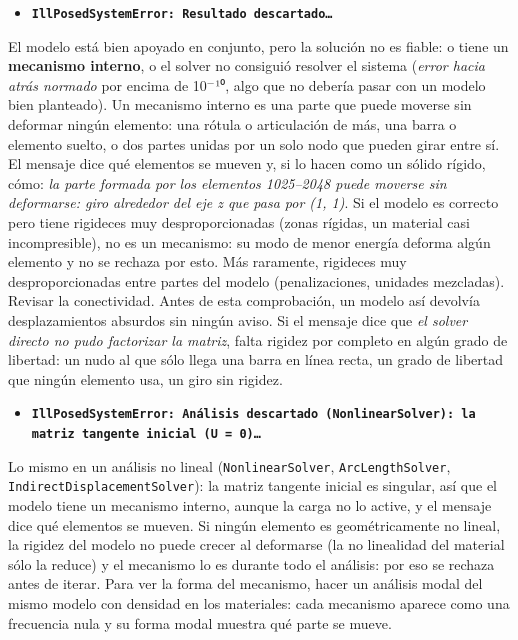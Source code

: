 \documentclass[11pt,oneside]{report}
\begin{document}
\begin{itemize}
  \item \textbf{\texttt{IllPosedSystemError: Resultado descartado\ldots{}}}
\end{itemize}
  El modelo está bien apoyado en conjunto, pero la solución no es fiable: o tiene un \textbf{mecanismo interno}, o el solver no consiguió resolver el sistema (\textit{error hacia atrás normado} por encima de 10\ensuremath{^{-}}¹⁰, algo que no debería pasar con un modelo bien planteado). Un mecanismo interno es una parte que puede moverse sin deformar ningún elemento: una rótula o articulación de más, una barra o elemento suelto, o dos partes unidas por un solo nodo que pueden girar entre sí. El mensaje dice qué elementos se mueven y, si lo hacen como un sólido rígido, cómo: \textit{\textquotedbl{}la parte formada por los elementos 1025--2048 puede moverse sin deformarse: giro alrededor del eje z que pasa por (1, 1)\textquotedbl{}}. Si el modelo es correcto pero tiene rigideces muy desproporcionadas (zonas rígidas, un material casi incompresible), no es un mecanismo: su modo de menor energía deforma algún elemento y no se rechaza por esto. Más raramente, rigideces muy desproporcionadas entre partes del modelo (penalizaciones, unidades mezcladas). Revisar la conectividad. Antes de esta comprobación, un modelo así devolvía desplazamientos absurdos sin ningún aviso. Si el mensaje dice que \textit{el solver directo no pudo factorizar la matriz}, falta rigidez por completo en algún grado de libertad: un nudo al que sólo llega una barra en línea recta, un grado de libertad que ningún elemento usa, un giro sin rigidez.

\begin{itemize}
  \item \textbf{\texttt{IllPosedSystemError: Análisis descartado (NonlinearSolver): la matriz tangente inicial (U = 0)\ldots{}}}
\end{itemize}
  Lo mismo en un análisis no lineal (\texttt{NonlinearSolver}, \texttt{ArcLengthSolver}, \texttt{IndirectDisplacementSolver}): la matriz tangente inicial es singular, así que el modelo tiene un mecanismo interno, aunque la carga no lo active, y el mensaje dice qué elementos se mueven. Si ningún elemento es geométricamente no lineal, la rigidez del modelo no puede crecer al deformarse (la no linealidad del material sólo la reduce) y el mecanismo lo es durante todo el análisis: por eso se rechaza antes de iterar. Para ver la forma del mecanismo, hacer un análisis modal del mismo modelo con densidad en los materiales: cada mecanismo aparece como una frecuencia nula y su forma modal muestra qué parte se mueve.
\end{document}
